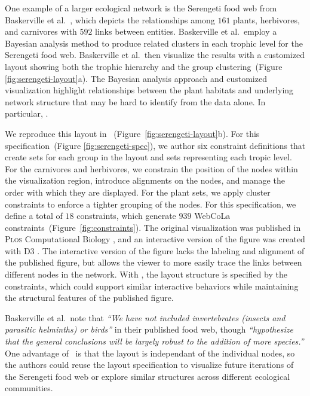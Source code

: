 
One example of a larger ecological network is the Serengeti food web from
Baskerville et al.~\cite{baskerville2011spatial}, which depicts the
relationships among $161$ plants, herbivores, and carnivores with $592$ links
between entities. Baskerville et al.\ employ a Bayesian analysis method to
produce related clusters in each trophic level for the Serengeti food web.
Baskerville et al.\ then visualize the results with a
customized layout showing both the trophic hierarchy and
the group clustering~(Figure \ref{fig:serengeti-layout}a). The Bayesian
analysis approach and customized visualization highlight relationships between
the plant habitats and underlying network structure that may be hard to identify
from the data alone. In particular, .

We reproduce this layout in \projectname~(Figure~\ref{fig:serengeti-layout}b).
For this specification~(Figure \ref{fig:serengeti-spec}), we author six constraint 
definitions that create sets for each group in the layout and sets 
representing each tropic level. For the carnivores and herbivores,
we constrain the position of the nodes within the visualization region,
introduce alignments on the nodes, and manage the order with which they
are displayed. For the plant sets, we apply cluster constraints
to enforce a tighter grouping of the nodes. For this specification,
we define a total of $18$ \projectname constraints, which generate $939$
WebCoLa constraints~(Figure~\ref{fig:constraints}).
The original visualization was published in \textsc{Plos} Computational
Biology \cite{baskerville2011spatial}, and an interactive version of the
figure was created with D3 \cite{baskerville2011interactive}. The
interactive version of the figure lacks the labeling and alignment of the
published figure, but allows the viewer to more easily trace the links
between different nodes in the network. With \projectname, the layout
structure is specified by the constraints, which could support similar
interactive behaviors while maintaining the structural features of the
published figure.

Baskerville et al.\ note that \emph{``We have not included invertebrates
  (insects and parasitic helminths) or birds''} in their published food
web, though \emph{``hypothesize that the general conclusions will be
  largely robust to the addition of more species.''} One advantage of
\projectname~is that the layout is independant of the individual nodes, so
the authors could reuse the layout specification to visualize future iterations
of the Serengeti food web or explore similar structures across different
ecological communities.
